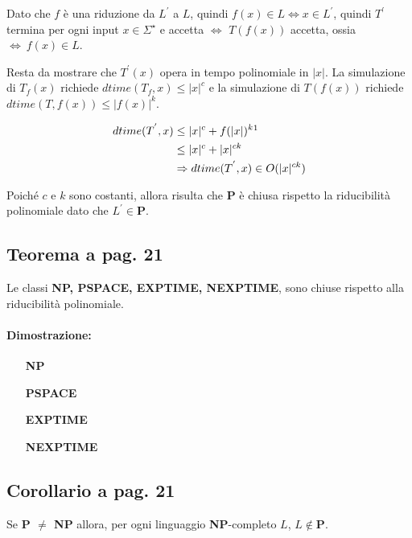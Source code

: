 Dato che $f$ è una riduzione da $L^{'}$ a $L$, quindi $f(x) \in L \Leftrightarrow x \in L^{'}$, quindi $T^{'}$ termina per 
ogni input $x \in \Sigma^{\star}$ e accetta $\Leftrightarrow$ $T(f(x))$ accetta, ossia $\Leftrightarrow\ f(x) \in L$.

Resta da mostrare che $T^{'}(x)$ opera in tempo polinomiale in $|x|$. La simulazione di $T_{f}(x)$ richiede 
$dtime(T_{f}, x) \leq |x|^c$ e la simulazione di $T(f(x))$ richiede $dtime(T, f(x)) \leq |f(x)|^k$.

\[
    \begin{aligned}[t]
        dtime(T^{'}, x) &\leq |x|^c + f(|x|)^k\footnote{$f(|x|)^k = |y|^k$ che per il teorema: $dspace(T, x) \leq dtime(T, x)$, 
        $|y|^k \leq (|x|^c)^k = |x|^{ck}$} \\
                &\leq |x|^c + |x|^{ck}\\
                &\Rightarrow dtime(T^{'}, x) \in O(|x|^{ck})
    \end{aligned}
\]

Poiché $c$ e $k$ sono costanti, allora risulta che \textbf{P} è chiusa rispetto la riducibilità polinomiale dato che $L^{'} \in \textbf{P}$.

\subsection{Teorema a pag. 21}

Le classi \textbf{NP, PSPACE, EXPTIME, NEXPTIME}, sono chiuse rispetto alla riducibilità polinomiale.

\paragraph*{Dimostrazione:} 

\begin{itemize}
    \item [\textbf{NP}]
    \item [\textbf{PSPACE}]
    \item [\textbf{EXPTIME}]
    \item [\textbf{NEXPTIME}]
\end{itemize}

\subsection{Corollario a pag. 21}

Se \textbf{P $\neq$ NP} allora, per ogni linguaggio \textbf{NP}-completo $L$, $L \notin \textbf{P}$.

